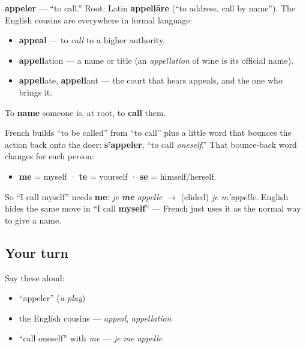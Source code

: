 \begin{cousinweb}
\textbf{appeler} — \textquotedblleft{}to call.\textquotedblright{} Root: Latin \textbf{appellāre} (\textquotedblleft{}to address, call by name\textquotedblright{}). The English cousins are everywhere in formal language:

\begin{itemize}
\raggedright
  \item \textbf{appeal} — to \emph{call} to a higher authority.
  \item \textbf{appell}ation — a name or title (an \emph{appellation} of wine is its official name).
  \item \textbf{appell}ate, \textbf{appell}ant — the court that hears appeals, and the one who brings it.
\end{itemize}

To \textbf{name} someone is, at root, to \textbf{call} them.
\end{cousinweb}

\begin{grammarlens}[title={Grammar Lens: reflexive verbs — doing something to yourself}]
French builds \textquotedblleft{}to be called\textquotedblright{} from \textquotedblleft{}to call\textquotedblright{} plus a little word that bounces the action back onto the doer: \textbf{s'appeler}, \textquotedblleft{}to call \emph{oneself}.\textquotedblright{} That bounce-back word changes for each person:

\begin{itemize}
\raggedright
  \item \textbf{me} = myself · \textbf{te} = yourself · \textbf{se} = himself/herself.
\end{itemize}

So \textquotedblleft{}I call myself\textquotedblright{} needs \textbf{me}: \emph{je \textbf{me} appelle} $\to$ (elided) \emph{je m'appelle}. English hides the same move in \textquotedblleft{}I call \textbf{myself}\textquotedblright{} — French just uses it as the normal way to give a name.
\end{grammarlens}

\subsection*{Your turn}
Say these aloud:

\begin{itemize}
\raggedright
  \item \textquotedblleft{}appeler\textquotedblright{} (\emph{a-play})
  \item the English cousins — \emph{appeal}, \emph{appellation}
  \item \textquotedblleft{}call oneself\textquotedblright{} with \emph{me} — \emph{je me appelle}
\end{itemize}

